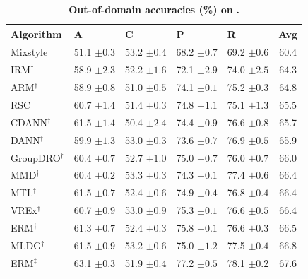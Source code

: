\begin{table}[H]
\centering
\small
\renewcommand{\arraystretch}{1.1}
\caption{\small\textbf{Out-of-domain accuracies (\%) on} \textbf{.}}
\begin{tabular}{lllll|c}
\toprule
\textbf{Algorithm} & \textbf{A} & \textbf{C} & \textbf{P} & \textbf{R} & \textbf{Avg} \\
\midrule
Mixstyle$^\ddagger$ & 51.1 \scriptsize$\pm0.3$ & 53.2 \scriptsize$\pm0.4$ & 68.2 \scriptsize$\pm0.7$ & 69.2 \scriptsize$\pm0.6$ & 60.4 \\
IRM$^\dagger$ & 58.9 \scriptsize$\pm2.3$ & 52.2 \scriptsize$\pm1.6$ & 72.1 \scriptsize$\pm2.9$ & 74.0 \scriptsize$\pm2.5$ & 64.3 \\
ARM$^\dagger$ & 58.9 \scriptsize$\pm0.8$ & 51.0 \scriptsize$\pm0.5$ & 74.1 \scriptsize$\pm0.1$ & 75.2 \scriptsize$\pm0.3$ & 64.8 \\
RSC$^\dagger$ & 60.7 \scriptsize$\pm1.4$ & 51.4 \scriptsize$\pm0.3$ & 74.8 \scriptsize$\pm1.1$ & 75.1 \scriptsize$\pm1.3$ & 65.5 \\
CDANN$^\dagger$ & 61.5 \scriptsize$\pm1.4$ & 50.4 \scriptsize$\pm2.4$ & 74.4 \scriptsize$\pm0.9$ & 76.6 \scriptsize$\pm0.8$ & 65.7 \\
DANN$^\dagger$ & 59.9 \scriptsize$\pm1.3$ & 53.0 \scriptsize$\pm0.3$ & 73.6 \scriptsize$\pm0.7$ & 76.9 \scriptsize$\pm0.5$ & 65.9 \\
GroupDRO$^\dagger$ & 60.4 \scriptsize$\pm0.7$ & 52.7 \scriptsize$\pm1.0$ & 75.0 \scriptsize$\pm0.7$ & 76.0 \scriptsize$\pm0.7$ & 66.0 \\
MMD$^\dagger$ & 60.4 \scriptsize$\pm0.2$ & 53.3 \scriptsize$\pm0.3$ & 74.3 \scriptsize$\pm0.1$ & 77.4 \scriptsize$\pm0.6$ & 66.4 \\
MTL$^\dagger$ & 61.5 \scriptsize$\pm0.7$ & 52.4 \scriptsize$\pm0.6$ & 74.9 \scriptsize$\pm0.4$ & 76.8 \scriptsize$\pm0.4$ & 66.4 \\
VREx$^\dagger$ & 60.7 \scriptsize$\pm0.9$ & 53.0 \scriptsize$\pm0.9$ & 75.3 \scriptsize$\pm0.1$ & 76.6 \scriptsize$\pm0.5$ & 66.4 \\
ERM$^\dagger$ & 61.3 \scriptsize$\pm0.7$ & 52.4 \scriptsize$\pm0.3$ & 75.8 \scriptsize$\pm0.1$ & 76.6 \scriptsize$\pm0.3$ & 66.5 \\
MLDG$^\dagger$ & 61.5 \scriptsize$\pm0.9$ & 53.2 \scriptsize$\pm0.6$ & 75.0 \scriptsize$\pm1.2$ & 77.5 \scriptsize$\pm0.4$ & 66.8 \\
ERM$^\ddagger$ & 63.1 \scriptsize$\pm0.3$ & 51.9 \scriptsize$\pm0.4$ & 77.2 \scriptsize$\pm0.5$ & 78.1 \scriptsize$\pm0.2$ & 67.6 \\

\end{tabular}
\end{table}
